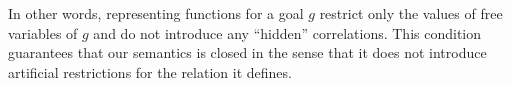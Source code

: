 \begin{comment}
\[
\forall {\mathfrak f}, {\mathfrak f'}:  \left.{\mathfrak f}\right|_{FV(g)} = \left.{\mathfrak f'}\right|_{FV(g)}, \quad {\mathfrak f} \in \sembr{g} \Leftrightarrow {\mathfrak f'} \in \sembr{g}
\]
\end{comment}

In other words, representing functions for a goal $g$ restrict only the values of free variables of $g$ and do not introduce any ``hidden'' correlations.
This condition guarantees that our semantics is closed in the sense that it does not introduce artificial restrictions for the relation it defines.
